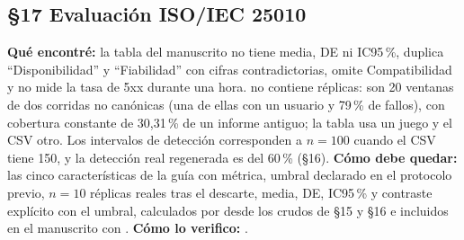 \subsection*{\S17 Evaluaci\'on ISO/IEC 25010}
\textbf{Qu\'e encontr\'e:} la tabla del manuscrito no tiene media, DE ni IC95\,\%, duplica ``Disponibilidad'' y ``Fiabilidad'' con cifras contradictorias, omite Compatibilidad y no mide la tasa de 5xx durante una hora.  no contiene r\'eplicas: son 20 ventanas de dos corridas no can\'onicas (una de ellas con un usuario y 79\,\% de fallos), con cobertura constante de 30,31\,\% de un informe antiguo; la tabla usa un juego y el CSV otro. Los intervalos de detecci\'on corresponden a $n=100$ cuando el CSV tiene 150, y la detecci\'on real regenerada es del 60\,\% (\S16). \textbf{C\'omo debe quedar:} las cinco caracter\'isticas de la gu\'ia con m\'etrica, umbral declarado en el protocolo previo, $n=10$ r\'eplicas reales tras el descarte, media, DE, IC95\,\% y contraste expl\'icito con el umbral, calculados por  desde los crudos de \S15 y \S16 e incluidos en el manuscrito con . \textbf{C\'omo lo verifico:} .

